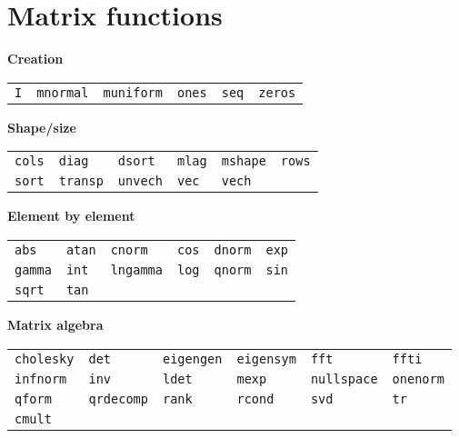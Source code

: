 \section{Matrix functions}
\label{matrix-func}

\newlength{\cwid}
\setlength{\cwid}{0.1\textwidth}

\begin{table}[htbp]
\centering
\textbf{Creation}
\hrulefill

\begin{tabular}{p{\cwid}p{\cwid}p{\cwid}p{\cwid}p{\cwid}p{\cwid}}
\texttt{I}         &
\texttt{mnormal}   &
\texttt{muniform}  &
\texttt{ones}      &
\texttt{seq}       &
\texttt{zeros}     
\end{tabular}      

\textbf{Shape/size}
\hrulefill

\begin{tabular}{p{\cwid}p{\cwid}p{\cwid}p{\cwid}p{\cwid}p{\cwid}}
\texttt{cols}      &
\texttt{diag}      &
\texttt{dsort}     &
\texttt{mlag}      &
\texttt{mshape}    &
\texttt{rows}      \\
\texttt{sort}      &
\texttt{transp}    &
\texttt{unvech}    &
\texttt{vec}       &
\texttt{vech}      
\end{tabular}      

\textbf{Element by element}
\hrulefill

\begin{tabular}{p{\cwid}p{\cwid}p{\cwid}p{\cwid}p{\cwid}p{\cwid}}
\texttt{abs}       &
\texttt{atan}      &
\texttt{cnorm}     &
\texttt{cos}       &
\texttt{dnorm}     &
\texttt{exp}       \\
\texttt{gamma}     &
\texttt{int}       &
\texttt{lngamma}   &
\texttt{log}       &
\texttt{qnorm}     &
\texttt{sin}       \\
\texttt{sqrt}      &
\texttt{tan}       
\end{tabular}      

\textbf{Matrix algebra}
\hrulefill

\begin{tabular}{p{\cwid}p{\cwid}p{\cwid}p{\cwid}p{\cwid}p{\cwid}}
\texttt{cholesky}  &
\texttt{det}       &
\texttt{eigengen}  &
\texttt{eigensym}  &
\texttt{fft}       &
\texttt{ffti}      \\
\texttt{infnorm}   &
\texttt{inv}       &
\texttt{ldet}      &
\texttt{mexp}      &
\texttt{nullspace} &
\texttt{onenorm}   \\
\texttt{qform}     &
\texttt{qrdecomp}  &
\texttt{rank}      &
\texttt{rcond}     &
\texttt{svd}       &
\texttt{tr}        \\
\texttt{cmult}      
\end{tabular}      


\end{table}
